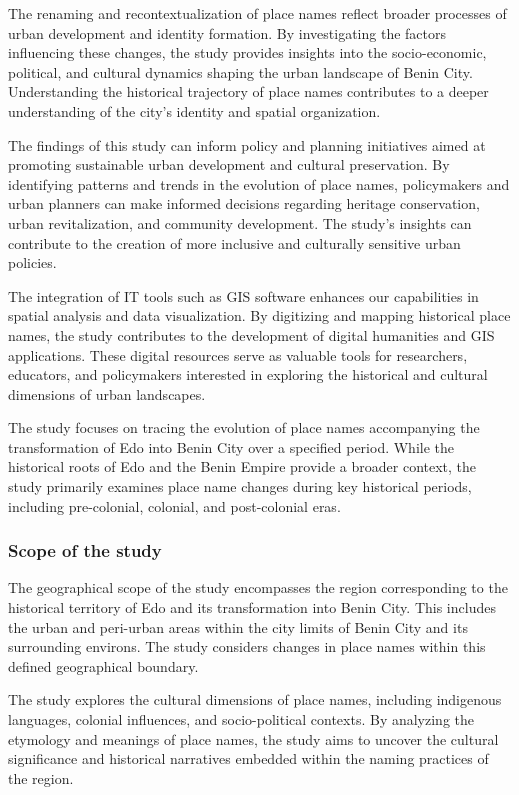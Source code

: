 The renaming and recontextualization of place names reflect broader processes of urban development and identity formation. By investigating the factors influencing these changes, the study provides insights into the socio-economic, political, and cultural dynamics shaping the urban landscape of Benin City. Understanding the historical trajectory of place names contributes to a deeper understanding of the city's identity and spatial organization.


The findings of this study can inform policy and planning initiatives aimed at promoting sustainable urban development and cultural preservation. By identifying patterns and trends in the evolution of place names, policymakers and urban planners can make informed decisions regarding heritage conservation, urban revitalization, and community development. The study's insights can contribute to the creation of more inclusive and culturally sensitive urban policies.


The integration of IT tools such as GIS software enhances our capabilities in spatial analysis and data visualization. By digitizing and mapping historical place names, the study contributes to the development of digital humanities and GIS applications. These digital resources serve as valuable tools for researchers, educators, and policymakers interested in exploring the historical and cultural dimensions of urban landscapes.


The study focuses on tracing the evolution of place names accompanying the transformation of Edo into Benin City over a specified period. While the historical roots of Edo and the Benin Empire provide a broader context, the study primarily examines place name changes during key historical periods, including pre-colonial, colonial, and post-colonial eras.
\subsubsection{Scope of the study}
The geographical scope of the study encompasses the region corresponding to the historical territory of Edo and its transformation into Benin City. This includes the urban and peri-urban areas within the city limits of Benin City and its surrounding environs. The study considers changes in place names within this defined geographical boundary.


The study explores the cultural dimensions of place names, including indigenous languages, colonial influences, and socio-political contexts. By analyzing the etymology and meanings of place names, the study aims to uncover the cultural significance and historical narratives embedded within the naming practices of the region.


